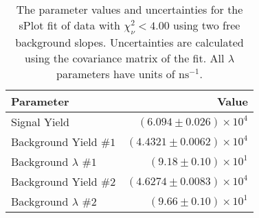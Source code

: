 
\begin{table}[ht]
    \begin{center}
        \begin{tabular}{lr}\toprule
            Parameter & Value \\\midrule
            Signal Yield & $(6.094 \pm 0.026) \times 10^{4}$ \\
            Background Yield $\#1$ & $(4.4321 \pm 0.0062) \times 10^{4}$ \\
            Background $\lambda$ $\#1$ & $(9.18 \pm 0.10) \times 10^{1}$ \\
            Background Yield $\#2$ & $(4.6274 \pm 0.0083) \times 10^{4}$ \\
            Background $\lambda$ $\#2$ & $(9.66 \pm 0.10) \times 10^{1}$ \\\bottomrule
        \end{tabular}
        \caption{The parameter values and uncertainties for the sPlot fit of data with $\chi^2_\nu < 4.00$ using two free background slopes. Uncertainties are calculated using the covariance matrix of the fit. All $\lambda$ parameters have units of $\si{\nano\second}^{-1}$.}\label{tab:splot-fit-results-chisqdof-4.00-free-2}
    \end{center}
\end{table}
